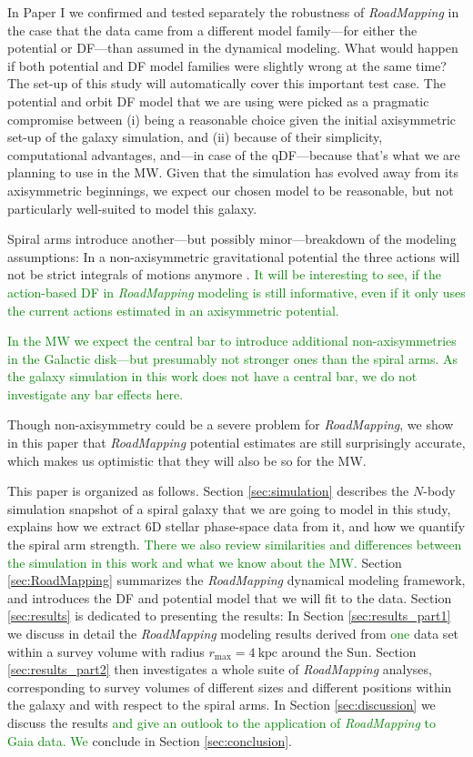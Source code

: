 \documentclass[iop,revtex4,numberedappendix,appendixfloats]{emulateapj}
\newcommand{\RM}{{\sl RoadMapping}}
\newcommand{\NEW}[1]{\textcolor{Green}{#1}}
\newcommand{\OLD}[1]{}
\begin{document}
In Paper I we confirmed and tested separately the robustness of \RM{} in the case that the data came from a different model family---for either the potential or DF---than assumed in the dynamical modeling. What would happen if both potential and DF model families were slightly wrong at the same time? The set-up of this study will automatically cover this important test case. The potential and orbit DF model that we are using were picked as a pragmatic compromise between (i) being a reasonable choice given the initial axisymmetric set-up of the galaxy simulation, and (ii) because of their simplicity, computational advantages, and---in case of the qDF---because that's what we are planning to use in the MW. Given that the simulation has \OLD{also} evolved away from its axisymmetric beginnings, we expect our chosen model to be reasonable, but not particularly well-suited to model this galaxy.

Spiral arms introduce another---but possibly minor---breakdown of the modeling assumptions: In a non-axisymmetric gravitational potential the three actions will not be strict integrals of motions anymore \citep{2008gady.book.....B,2011A&A...527A.147M,2012A&A...548A.127M,2012MNRAS.422.1363S,2012MNRAS.421.1529G,2016ApJ...824...39V}. \NEW{It will be interesting to see, if the action-based DF in \RM{} modeling is still informative, even if it only uses the current actions estimated in an axisymmetric potential.}

\NEW{In the MW we expect the central bar to introduce additional non-axisymmetries in the Galactic disk---but presumably not stronger ones than the spiral arms. As the galaxy simulation in this work does not have a central bar, we do not investigate any bar effects here.}

Though non-axisymmetry could be a severe problem for \RM{}, we show in this paper that \RM{} potential estimates are still surprisingly accurate, which makes us optimistic that they will also be so for the MW. 

This paper is organized as follows. Section \ref{sec:simulation} describes the $N$-body simulation snapshot of a \OLD{MW-like} spiral galaxy that we are going to model in this study, explains how we extract 6D stellar phase-space data from it, and how we quantify the spiral arm strength. \NEW{There we also review similarities and differences between the simulation in this work and what we know about the MW.} Section \ref{sec:RoadMapping} summarizes the \RM{} dynamical modeling framework, and introduces the DF and potential model that we will fit to the data. Section \ref{sec:results} is dedicated to presenting the results: In Section \ref{sec:results_part1} we discuss in detail the \RM{} modeling results derived from \OLD{a}\NEW{one} data set within a survey volume with radius $r_\text{max}=4~\text{kpc}$ around the Sun. Section \ref{sec:results_part2} then investigates a whole suite of \RM{} analyses, corresponding to survey volumes of different sizes and different positions within the galaxy and with respect to the spiral arms. In Section \ref{sec:discussion} we discuss the results \NEW{and give an outlook to the application of \RM{} to Gaia data. We}\OLD{ and} conclude in Section \ref{sec:conclusion}.
\end{document}
